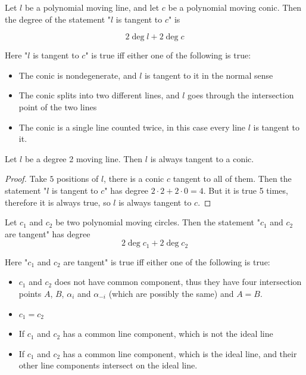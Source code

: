 \documentclass[a4paper]{article}
\begin{document}
\begin{theorem}
    Let $l$ be a polynomial moving line, and let $c$ be a polynomial moving conic. Then the degree of the statement "$l$ is tangent to $c$" is 
    
    $$2\deg l+ 2\deg c$$
\end{theorem}
\begin{remark}

    Here "$l$ is tangent to $c$" is true iff either one of the following is true:
\begin{itemize}
    \item The conic is nondegenerate, and $l$ is tangent to it in the normal sense
    \item The conic splits into two different lines, and $l$ goes through the intersection point of the two lines
    \item The conic is a single line counted twice, in this case every line $l$ is tangent to it.
\end{itemize}
\end{remark}
\begin{example}
    Let $l$ be a degree 2 moving line. Then $l$ is always tangent to a conic.

    \begin{proof}
        Take $5$ positions of $l$, there is a conic $c$ tangent to all of them. Then the statement "$l$ is tangent to $c$" has degree $2\cdot 2+2\cdot 0=4$. But it is true 5 times, therefore it is always true, so $l$ is always tangent to $c$.
    \end{proof}
\end{example}


\begin{theorem}
    Let $c_1$ and $c_2$ be two polynomial moving circles. Then the statement "$c_1$ and $c_2$ are tangent" has degree
    $$2\deg c_1 + 2\deg c_2$$
\end{theorem}
\begin{remark}
    Here "$c_1$ and $c_2$ are tangent" is true iff either one of the following is true:
    \begin{itemize}
        \item $c_1$ and $c_2$ does not have common component, thus they have four intersection points $A$, $B$, $\alpha_i$ and $\alpha_{-i}$ (which are possibly the same) and $A=B$.
        \item $c_1=c_2$
        \item If $c_1$ and $c_2$ has a common line component, which is not the ideal line
        \item If $c_1$ and $c_2$ has a common line component, which is the ideal line, and their other line components intersect on the ideal line.
    \end{itemize}
\end{remark}
\end{document}
